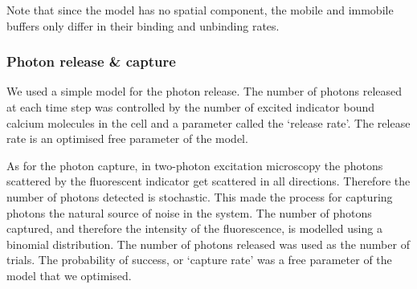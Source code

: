 Note that since the model has no spatial component, the mobile and immobile buffers only differ in their binding and unbinding rates.

\subsubsection{Photon release \& capture}
We used a simple model for the photon release. The number of photons released at each time step was controlled by the number of excited indicator bound calcium molecules in the cell and a parameter called the `release rate'. The release rate is an optimised free parameter of the model.

As for the photon capture, in two-photon excitation microscopy the photons scattered by the fluorescent indicator get scattered in all directions. Therefore the number of photons detected is stochastic. This made the process for capturing photons the natural source of noise in the system. The number of photons captured, and therefore the intensity of the fluorescence, is modelled using a binomial distribution. The number of photons released was used as the number of trials. The probability of success, or `capture rate' was a free parameter of the model that we optimised.

